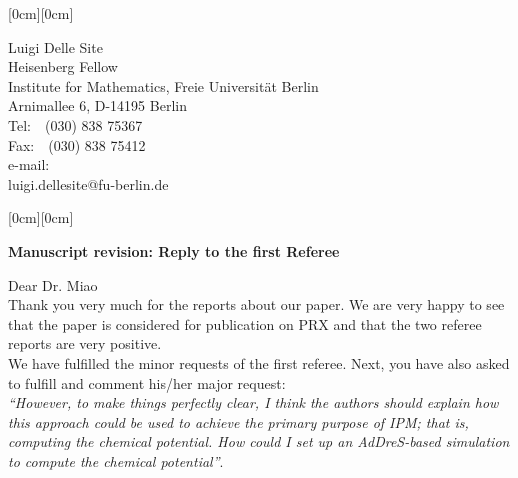 \documentclass[12pt,a4paper]{article}
\newcommand{\kopf}{\noindent
\raisebox{2.5cm}[0cm][0cm]
{
\parbox[c]{0.88\textwidth}
{
\begin{center}
\textsc{Luigi Delle Site, Heisenberg Fellow}
\end{center}
}
}
\raisebox{2cm}[0cm][0cm]{\rule{\textwidth}{0.2mm}}}
\begin{document}

\hfill\raisebox{1.5cm}[0cm][0cm]
{\parbox[t]{0.34\textwidth}
{Luigi Delle Site\\
Heisenberg Fellow\\
Institute for Mathematics, Freie Universit\"{a}t Berlin\\
Arnimallee 6, D-14195 Berlin\\
Tel:\ \ (030) 838 75367\\
Fax:\ \ (030) 838 75412\\
{\small e-mail:\\luigi.dellesite@fu-berlin.de}
}}

\noindent\raisebox{1.05cm}[0cm][0cm]
{}

\vspace{3cm}

\textbf{Manuscript revision: Reply to the first Referee}

\vspace{2cm}
Dear Dr. Miao\\
Thank you very much for the reports about our paper. We are very happy to see that the paper is considered for publication on PRX and that the two referee reports are very positive.\\
We have fulfilled the minor requests of the first referee. 
Next, you have also asked to fulfill and comment his/her major request:\\
 {\it ``However, to make things perfectly clear, I think the authors should explain how this approach could be
used to achieve the primary purpose of IPM; that is, computing the chemical potential. How could I set up
an AdDreS-based simulation to compute the chemical potential''}.\\
\end{document}

